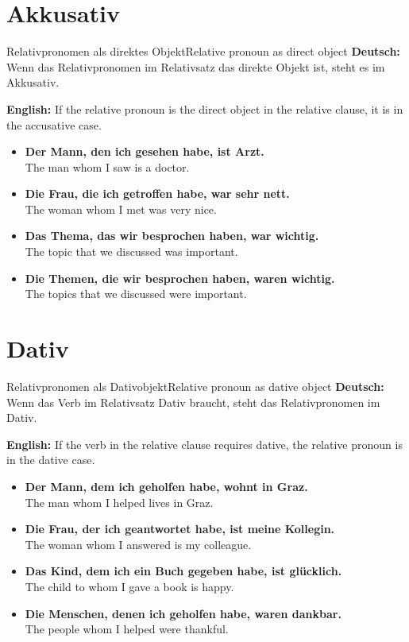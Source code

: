 \documentclass[a4paper,11pt]{article}
\newcommand{\GermanText}[1]{\textbf{Deutsch: }#1\par}
\newcommand{\EnglishText}[1]{{\small\color{SoftGray}\textbf{English: }#1\par}}
\newcommand{\ExampleItem}[2]{\item \textbf{#1}\\{\small\color{SoftGray}#2}}
\begin{document}
    
    \section{Akkusativ}
        
        \begin{grammarentry}{Relativpronomen als direktes Objekt}{Relative pronoun as direct object}
            \GermanText{Wenn das Relativpronomen im Relativsatz das direkte Objekt ist, steht es im Akkusativ.}
            \EnglishText{If the relative pronoun is the direct object in the relative clause, it is in the accusative case.}
            
            \begin{exbox}
                \begin{itemize}
                    \ExampleItem{Der Mann, den ich gesehen habe, ist Arzt.}{The man whom I saw is a doctor.}
                    \ExampleItem{Die Frau, die ich getroffen habe, war sehr nett.}{The woman whom I met was very nice.}
                    \ExampleItem{Das Thema, das wir besprochen haben, war wichtig.}{The topic that we discussed was important.}
                    \ExampleItem{Die Themen, die wir besprochen haben, waren wichtig.}{The topics that we discussed were important.}
                \end{itemize}
            \end{exbox}
        \end{grammarentry}
    
    
    \section{Dativ}
        
        \begin{grammarentry}{Relativpronomen als Dativobjekt}{Relative pronoun as dative object}
            \GermanText{Wenn das Verb im Relativsatz Dativ braucht, steht das Relativpronomen im Dativ.}
            \EnglishText{If the verb in the relative clause requires dative, the relative pronoun is in the dative case.}
            
            \begin{exbox}
                \begin{itemize}
                    \ExampleItem{Der Mann, dem ich geholfen habe, wohnt in Graz.}{The man whom I helped lives in Graz.}
                    \ExampleItem{Die Frau, der ich geantwortet habe, ist meine Kollegin.}{The woman whom I answered is my colleague.}
                    \ExampleItem{Das Kind, dem ich ein Buch gegeben habe, ist glücklich.}{The child to whom I gave a book is happy.}
                    \ExampleItem{Die Menschen, denen ich geholfen habe, waren dankbar.}{The people whom I helped were thankful.}
                \end{itemize}
            \end{exbox}
        \end{grammarentry}
    
\end{document}

